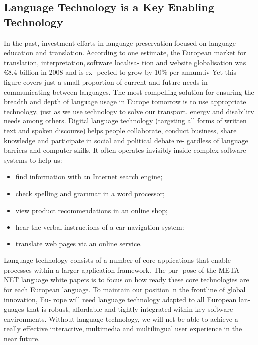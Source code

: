 \documentclass[]{../metanetpaper}
\begin{document}
\subsection{Language Technology is a Key Enabling Technology}
In the past, investment efforts in language preservation focused on
language education and translation. According to one estimate, the
European market for translation, interpretation, software localisa-
tion and website globalisation was €8.4 billion in 2008 and is ex-
pected to grow by 10\% per annum.iv Yet this figure covers just a
small proportion of current and future needs in communicating
between languages.  The most compelling solution for ensuring the
breadth and depth of language usage in Europe tomorrow is to use appropriate technology, just as we use technology to solve our
transport, energy and disability needs among others.
Digital language technology (targeting all forms of written text and
spoken discourse) helps people collaborate, conduct business,
share knowledge and participate in social and political debate re-
gardless of language barriers and computer skills. It often operates
invisibly inside complex software systems to help us:
\begin{itemize}
\item find information with an Internet search engine;
\item check spelling and grammar in a word processor;
\item view product recommendations in an online shop;
\item hear the verbal instructions of a car navigation system;
\item translate web pages via an online service.
\end{itemize}
Language technology consists of a number of core applications that
enable processes within a larger application framework. The pur-
pose of the META-NET language white papers is to focus on how
ready these core technologies are for each European language.
To maintain our position in the frontline of global innovation, Eu-
rope will need language technology adapted to all European lan-
guages that is robust, affordable and tightly integrated within key
software environments. Without language technology, we will not
be able to achieve a really effective interactive, multimedia and
multilingual user experience in the near future.
\end{document}
